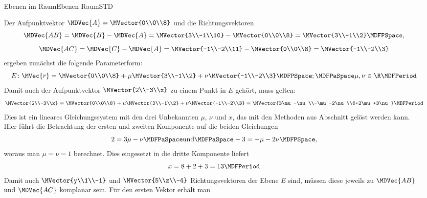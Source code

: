 \begin{MXContent}{Ebenen im Raum}{Ebenen Raum}{STD}
\begin{MExercise}
\begin{MHint}{\iSolution}
Der Aufpunktvektor $\MDVec{A}=\MVector{0\\0\\8}$ und die Richtungsvektoren
\[
 \MDVec{A B}=\MDVec{B}-\MDVec{A}=\MVector{3\\-1\\10}-\MVector{0\\0\\8}=\MVector{3\\-1\\2} \MDFPSpace,
\]
\[
 \MDVec{A C}=\MDVec{C}-\MDVec{A}=\MVector{-1\\-2\\11}-\MVector{0\\0\\8}=\MVector{-1\\-2\\3}
\]
ergeben zunächst die folgende Parameterform:
\[
 E\colon\MVec{r}=\MVector{0\\0\\8}+\mu\MVector{3\\-1\\2}+\nu\MVector{-1\\-2\\3}\MDFPSpace;\MDFPaSpace \mu,\nu\in\R\MDFPeriod
\]
Damit auch der Aufpunktvektor $\MVector{2\\-3\\x}$ zu einem Punkt in $E$ gehört, muss gelten:
\[
 \MVector{2\\-3\\x}=\MVector{0\\0\\8}+\mu\MVector{3\\-1\\2}+\nu\MVector{-1\\-2\\3}=\MVector{3\mu-\nu\\-\mu-2\nu\\8+2\mu+3\nu}\MDFPeriod
\]
Dies ist ein lineares Gleichungssystem mit den drei Unbekannten $\mu$, $\nu$ und $x$, das mit den Methoden aus Abschnitt  gelöst werden kann. Hier führt die Betrachtung der ersten und zweiten Komponente auf die beiden Gleichungen
\[
 2=3\mu-\nu\MDFPaSpace\textrm{und}\MDFPaSpace -3=-\mu-2\nu \MDFPSpace,
\]
woraus man $\mu=\nu=1$ berechnet. Dies eingesetzt in die dritte Komponente liefert
\[
 x=8+2+3=13 \MDFPeriod
\]
Damit auch $\MVector{y\\1\\-1}$ und $\MVector{5\\z\\-4}$ Richtungsvektoren der Ebene $E$ sind, müssen diese jeweils zu $\MDVec{A B}$ und $\MDVec{A C}$ komplanar sein. Für den ersten Vektor erhält man

\end{MHint}
\end{MExercise}
\end{MXContent}
